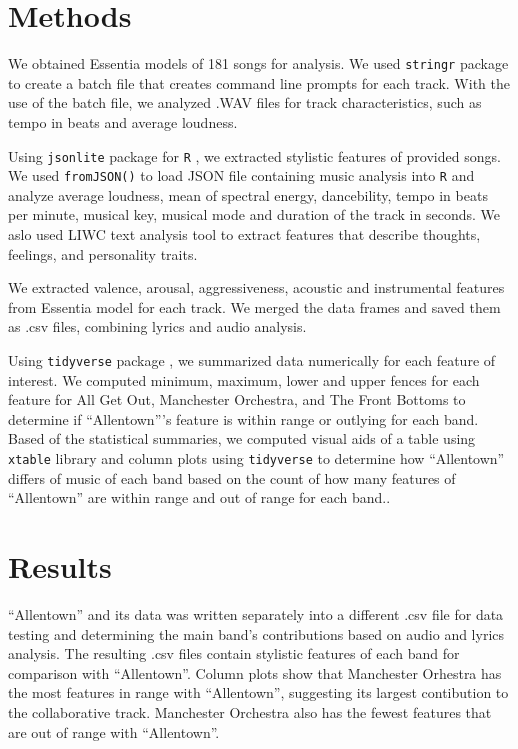 \documentclass{article}\usepackage[]{graphicx}\usepackage[]{xcolor}
\begin{document}
\begin{multicols}{2}
\section{Methods}
We obtained Essentia models \citep{alonso2020tensorflow} of 181 songs for analysis. We used \texttt{stringr} package \citep{stringr} to create a batch file that creates command line prompts for each track. With the use of the batch file, we analyzed .WAV files for track characteristics, such as tempo in beats and average loudness.

Using \texttt{jsonlite} package for \texttt{R} \citep{jsonlite}, we extracted stylistic features of provided songs. We used \texttt{fromJSON()} to load JSON file containing music analysis into \texttt{R} and analyze average loudness, mean of spectral energy, dancebility, tempo in beats per minute, musical key, musical mode and duration of the track in seconds. We aslo used LIWC text analysis tool \citep{boyd2022development} to extract features that describe thoughts, feelings, and personality traits.

We extracted valence, arousal, aggressiveness, acoustic and instrumental features from Essentia model for each track. We merged the data frames and saved them as .csv files, combining lyrics and audio analysis. 

Using \texttt{tidyverse} package \citep{tidyverse}, we summarized data numerically for each feature of interest. We computed minimum, maximum, lower and upper fences for each feature for All Get Out, Manchester Orchestra, and The Front Bottoms to determine if ``Allentown'''s feature is within range or outlying for each band. Based of the statistical summaries, we computed visual aids of a table using \texttt{xtable} library \citep{xtable} and column plots using \texttt{tidyverse} to determine how ``Allentown'' differs of music of each band based on the count of how many features of ``Allentown'' are within range and out of range for each band..


\section{Results}
``Allentown'' and its data was written separately into a different .csv file for data testing and determining the main band's contributions based on audio and lyrics analysis. The resulting .csv files contain stylistic features of each band for comparison with ``Allentown''. Column plots show that Manchester Orhestra has the most features in range with ``Allentown'', suggesting its largest contibution to the collaborative track. Manchester Orchestra also has the fewest features that are out of range with ``Allentown''. 


\end{multicols}
\end{document}
